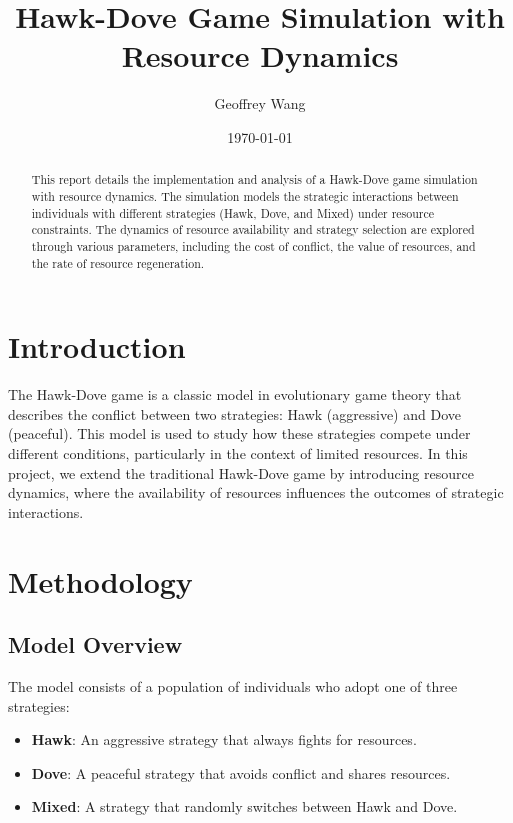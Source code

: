 \documentclass{article}
\title{Hawk-Dove Game Simulation with Resource Dynamics}
\author{Geoffrey Wang}
\date{\today}
\begin{document}
\maketitle

\begin{abstract}
This report details the implementation and analysis of a Hawk-Dove game simulation with resource dynamics. The simulation models the strategic interactions between individuals with different strategies (Hawk, Dove, and Mixed) under resource constraints. The dynamics of resource availability and strategy selection are explored through various parameters, including the cost of conflict, the value of resources, and the rate of resource regeneration.
\end{abstract}

\section{Introduction}
The Hawk-Dove game is a classic model in evolutionary game theory that describes the conflict between two strategies: Hawk (aggressive) and Dove (peaceful). This model is used to study how these strategies compete under different conditions, particularly in the context of limited resources. In this project, we extend the traditional Hawk-Dove game by introducing resource dynamics, where the availability of resources influences the outcomes of strategic interactions.

\section{Methodology}
\subsection{Model Overview}
The model consists of a population of individuals who adopt one of three strategies:
\begin{itemize}
    \item \textbf{Hawk}: An aggressive strategy that always fights for resources.
    \item \textbf{Dove}: A peaceful strategy that avoids conflict and shares resources.
    \item \textbf{Mixed}: A strategy that randomly switches between Hawk and Dove.
\end{itemize}
\end{document}
